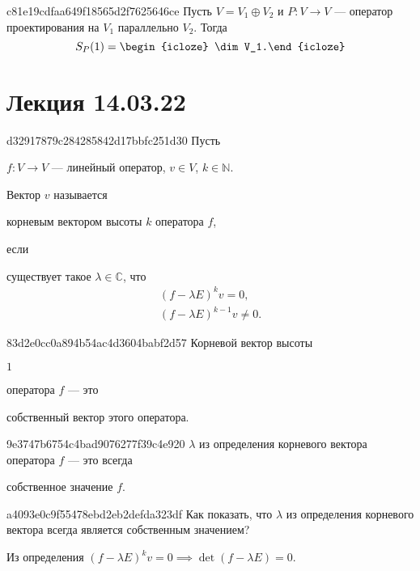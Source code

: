 \begin{note}{c81e19cdfaa649f18565d2f7625646ce}
    Пусть \( V = V_1 \oplus V_2 \) и \( P : V \to V \) --- оператор проектирования на \( V_1 \) параллельно \( V_2 \).
    Тогда
    \[
        S_P (1) = \begin{icloze}{1}\dim V_1.\end{icloze}
    \]
\end{note}

\section{Лекция 14.03.22}
\begin{note}{d32917879c284285842d17bbfc251d30}
    Пусть \begin{icloze}{3}\( f : V \to V \) --- линейный оператор, \( v \in V \), \( k \in \mathbb N \).\end{icloze} Вектор \( v \) называется \begin{icloze}{2}корневым вектором высоты \( k \) оператора \( f \),\end{icloze} если \begin{icloze}{1}существует такое \( \lambda \in \mathbb C \), что
    \[
        \begin{gathered}
            (f - \lambda E)^{k} v = 0, \\
            (f - \lambda E)^{k - 1} v \neq 0.
        \end{gathered}
    \]\end{icloze}
\end{note}

\begin{note}{83d2e0cc0a894b54ac4d3604babf2d57}
    Корневой вектор высоты \begin{icloze}{2}\( 1 \)\end{icloze} оператора \( f \) --- это \begin{icloze}{1}собственный вектор этого оператора.\end{icloze}
\end{note}

\begin{note}{9e3747b6754c4bad9076277f39c4e920}
    \( \lambda \) из определения корневого вектора оператора \( f \) --- это всегда \begin{icloze}{1}собственное значение \( f \).\end{icloze}
\end{note}

\begin{note}{a4093e0c9f55478ebd2eb2defda323df}
    Как показать, что \( \lambda \) из определения корневого вектора всегда является собственным значением?

    \begin{cloze}{1}
        Из определения \( (f - \lambda E)^{k} v = 0 \implies \det (f - \lambda E) = 0 \).
    \end{cloze}
\end{note}

